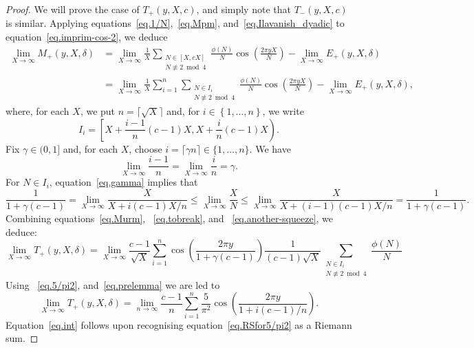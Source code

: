 \documentclass{amsart}
\theoremstyle{definition}
\numberwithin{equation}{section}
\begin{document}
\begin{proof}
We will prove the case of $T_+(y,X,c)$, and simply note that $T_-(y,X,c)$ is similar. 
Applying equations~\eqref{eq.1/N},~\eqref{eq.Mpm}, and~\eqref{eq.Ilavanish_dyadic} to equation~\eqref{eq.imprim-cos-2}, we deduce
\begin{equation}\label{eq.tobreak}
\begin{split}
\lim_{X \to \infty} M_{+}(y,X,\delta) &= \lim_{X \to \infty} \frac{1}{X} \sum_{\substack{N \in [X, cX] \\ N \not\equiv 2\bmod 4}} \frac{\phi(N)}{N}\cos\left(\frac{2\pi yX}{N}\right)-\lim_{X\rightarrow\infty}E_+(y,X,\delta)\\
&=\lim_{X \to \infty} \frac{1}{X} \sum_{i=1}^{n} \sum_{\substack{N \in I_i \\ N \not\equiv 2 \bmod 4}} \frac{\phi(N)}{N} \cos\left(\frac{2\pi y X}{N}\right)-\lim_{X\rightarrow\infty}E_+(y,X,\delta),
\end{split}
\end{equation}
where, for each $X$, we put $n=\lceil \sqrt{X} \rceil$ and, for $i\in\left\{1,\dots,n\right\}$, we write
\begin{equation}
I_i = \left[X + \frac{i-1}{n}(c-1)X, X + \frac{i}{n}(c-1)X \right).
\end{equation}
Fix $\gamma \in (0, 1]$ and, for each $X$, choose $i = \lceil \gamma n\rceil\in\{1,\dots,n\}$. 
We have
\begin{equation}\label{eq.gamma}
\lim_{X \to \infty} \frac{i-1}{n} = \lim_{X \to \infty }\frac{i}{n} = \gamma.
\end{equation}
For $N \in I_i$, equation~\eqref{eq.gamma} implies that
\begin{equation}\label{eq.another-squeeze}
\frac{1}{1+\gamma(c-1)} = \lim_{X \to \infty} \frac{X}{X+i(c-1)X/n} \leq \lim_{X \to \infty} \frac{X}{N} \leq \lim_{X \to \infty}\frac{X}{X+(i-1)(c-1)X/n} = \frac{1}{1+\gamma(c-1)}.
\end{equation}
Combining equations~\eqref{eq.Murm}, ~\eqref{eq.tobreak}, and ~\eqref{eq.another-squeeze}, we deduce:
\begin{equation}\label{eq.prelemma}
\lim_{X \to \infty} T_{+}(y,X,\delta)  =  \lim_{X \to \infty}\frac{c-1}{\sqrt{X}} \sum_{i=1}^n  \cos\left(\frac{2\pi y}{1+\gamma(c-1)}\right) \frac{1}{(c-1)\sqrt{X}} \sum_{\substack{N \in I_i \\ N \not\equiv 2 \bmod 4}} \frac{\phi(N)}{N}
\end{equation}
Using ~\eqref{eq.5/pi2}, and~\eqref{eq.prelemma} we are led to
\begin{equation}\label{eq.RSfor5/pi2}
\lim_{X \to \infty} T_{+}(y,X,\delta)  = \lim_{n \to \infty} \frac{c-1}{n} \sum_{i=1}^n   \frac{5}{\pi^2}\cos\left(\frac{2\pi y}{1+i(c-1)/n}\right).
\end{equation}
Equation~\eqref{eq.int} follows upon recognising equation~\eqref{eq.RSfor5/pi2} as a Riemann sum.
\end{proof}
\end{document}

